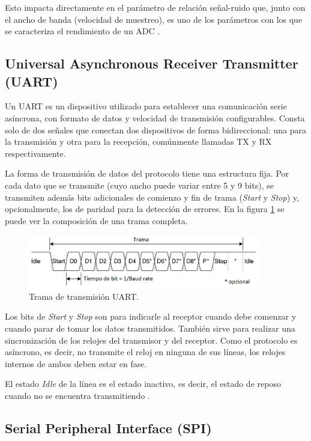 Esto impacta directamente en el parámetro de relación señal-ruido que, junto con el ancho de banda (velocidad de muestreo), es uno de los parámetros con los que se caracteriza el rendimiento de un ADC \citep{WEBSITE:2}.

\subsection{Universal Asynchronous Receiver Transmitter (UART)}

Un UART es un dispositivo utilizado para establecer una comunicación serie asíncrona, con formato de datos y velocidad de transmisión configurables. Consta solo de dos señales que conectan dos dispositivos de forma bidireccional: una para la transmisión y otra para la recepción, comúnmente llamadas TX y RX respectivamente.

La forma de transmisión de datos del protocolo tiene una estructura fija. Por cada dato que se transmite (cuyo ancho puede variar entre 5 y 9 bits), se transmiten además bits adicionales de comienzo y fin de trama (\textit{Start} y \textit{Stop}) y, opcionalmente, los de paridad para la detección de errores. En la figura \ref{fig:transUART} se puede ver la composición de una trama completa.

\begin{figure}[H]
\centering
\includegraphics[width=0.9\textwidth]{./Figures/UART_frame.png}
\caption{Trama de transmisión UART.}
\label{fig:transUART}
\end{figure}

Los bits de \textit{Start} y \textit{Stop} son para indicarle al receptor cuando debe comenzar y cuando parar de tomar los datos transmitidos. También sirve para realizar una sincronización de los relojes del transmisor y del receptor. Como el protocolo es asíncrono, es decir, no transmite el reloj en ninguna de sus líneas, los relojes internos de ambos deben estar en fase.

El estado \textit{Idle} de la línea es el estado inactivo, es decir, el estado de reposo cuando no se encuentra transmitiendo \citep{WEBSITE:3}.

\subsection{Serial Peripheral Interface (SPI)}

